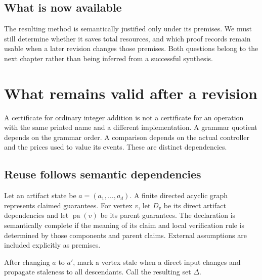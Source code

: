 \section*{What is now available}
The resulting method is semantically justified only under its premises. We must still determine whether it saves total resources, and which proof records remain usable when a later revision changes those premises. Both questions belong to the next chapter rather than being inferred from a successful synthesis.


\chapter{What remains valid after a revision}\label{Core:book:chapter-7}
\setcounter{section}{0}\label{Core:ch:revision}
A certificate for ordinary integer addition is not a certificate for an operation with the same printed name and a different implementation. A grammar quotient depends on the grammar order. A comparison depends on the actual controller and the prices used to value its events. These are distinct dependencies.

\section{Reuse follows semantic dependencies}
Let an artifact state be $a=(a_1,\ldots,a_d)$. A finite directed acyclic graph represents claimed guarantees. For vertex $v$, let $D_v$ be its direct artifact dependencies and let $\operatorname{pa}(v)$ be its parent guarantees. The declaration is semantically complete if the meaning of its claim and local verification rule is determined by those components and parent claims. External assumptions are included explicitly as premises.

After changing $a$ to $a'$, mark a vertex stale when a direct input changes and propagate staleness to all descendants. Call the resulting set $\Delta$.

